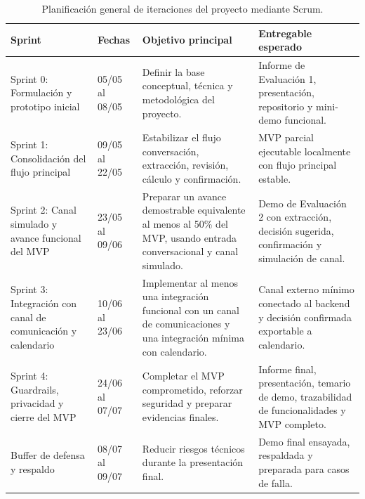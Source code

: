 \begin{table}[htbp]
\centering
\small
\renewcommand{\arraystretch}{1.25}
\begin{tabularx}{\textwidth}{p{2.6cm} p{2.4cm} X X}
\toprule
\textbf{Sprint} & \textbf{Fechas} & \textbf{Objetivo principal} & \textbf{Entregable esperado} \\
\midrule

Sprint 0: Formulación y prototipo inicial
& 05/05 al 08/05
& Definir la base conceptual, técnica y metodológica del proyecto.
& Informe de Evaluación 1, presentación, repositorio y mini-demo funcional. \\

\midrule

Sprint 1: Consolidación del flujo principal
& 09/05 al 22/05
& Estabilizar el flujo conversación, extracción, revisión, cálculo y confirmación.
& MVP parcial ejecutable localmente con flujo principal estable. \\

\midrule

Sprint 2: Canal simulado y avance funcional del MVP
& 23/05 al 09/06
& Preparar un avance demostrable equivalente al menos al 50\% del MVP, usando entrada conversacional y canal simulado.
& Demo de Evaluación 2 con extracción, decisión sugerida, confirmación y simulación de canal. \\

\midrule

Sprint 3: Integración con canal de comunicación y calendario
& 10/06 al 23/06
& Implementar al menos una integración funcional con un canal de comunicaciones y una integración mínima con calendario.
& Canal externo mínimo conectado al backend y decisión confirmada exportable a calendario. \\

\midrule

Sprint 4: Guardrails, privacidad y cierre del MVP
& 24/06 al 07/07
& Completar el MVP comprometido, reforzar seguridad y preparar evidencias finales.
& Informe final, presentación, temario de demo, trazabilidad de funcionalidades y MVP completo. \\

\midrule

Buffer de defensa y respaldo
& 08/07 al 09/07
& Reducir riesgos técnicos durante la presentación final.
& Demo final ensayada, respaldada y preparada para casos de falla. \\

\bottomrule
\end{tabularx}
\caption{Planificación general de iteraciones del proyecto mediante Scrum.}
\label{tab:planificacion-iteraciones}
\end{table}

